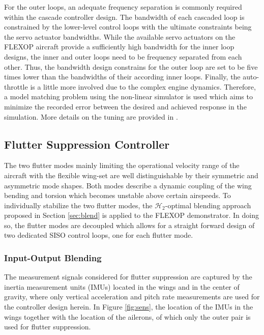 \documentclass[aerospace,article,submit,moreauthors,pdftex,10pt,a4paper]{Definitions/mdpi}
\begin{document}
For the outer loops, an adequate frequency separation is commonly required within the cascade controller design.
The bandwidth of each cascaded loop is constrained by the lower-level control loops with the ultimate constraints being the servo actuator bandwidths.  While the available servo actuators on the FLEXOP aircraft provide a sufficiently high bandwidth for the inner loop designs, the inner  and outer loops need to be frequency separated from each other. Thus, the bandwidth design constrains for the outer loop are set to be five times lower than the bandwidths of their according inner loops.
Finally, the auto-throttle is a little more involved due to the complex engine dynamics. Therefore, a model matching problem using the non-linear simulator is used which aims to minimize the recorded error between the desired and achieved response in the simulation. More details on the tuning are provided in \cite{Ossmann19a}.





\subsection{Flutter Suppression Controller}
The two flutter modes mainly limiting the operational velocity range of the aircraft with the flexible wing-set are  well distinguishable by their symmetric and asymmetric mode shapes. Both modes describe a dynamic coupling of the wing bending and torsion which becomes unstable above certain airspeeds.
To individually stabilize the two flutter modes, the $\mathcal{H}_2$-optimal blending approach proposed in Section \ref{sec:blend} is applied to the FLEXOP demonstrator. In doing so, the flutter modes are decoupled which allows for a straight forward design of two dedicated SISO control loops, one for each flutter mode. 


\subsubsection{Input-Output Blending}
The measurement signals considered for flutter suppression are captured by the inertia measurement units (IMUs) located in the wings and in the center of gravity, where only vertical acceleration and pitch rate measurements are used for the controller design herein.
In Figure \ref{fig:sens}, the location of the IMUs in the wings together with the location of the ailerons, of which only the outer pair is used for flutter suppression.
\end{document}
